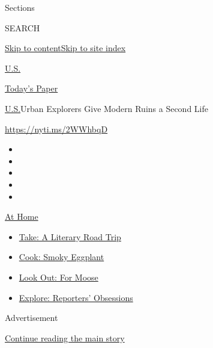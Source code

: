Sections

SEARCH

\protect\hyperlink{site-content}{Skip to
content}\protect\hyperlink{site-index}{Skip to site index}

\href{https://www.nytimes.com/section/us}{U.S.}

\href{https://myaccount.nytimes.com/auth/login?response_type=cookie\&client_id=vi}{}

\href{https://www.nytimes.com/section/todayspaper}{Today's Paper}

\href{/section/us}{U.S.}\textbar{}Urban Explorers Give Modern Ruins a
Second Life

\url{https://nyti.ms/2WWhbqD}

\begin{itemize}
\item
\item
\item
\item
\item
\end{itemize}

\href{https://www.nytimes.com/spotlight/at-home?action=click\&pgtype=Article\&state=default\&region=TOP_BANNER\&context=at_home_menu}{At
Home}

\begin{itemize}
\tightlist
\item
  \href{https://www.nytimes.com/2020/07/28/books/time-for-a-literary-road-trip.html?action=click\&pgtype=Article\&state=default\&region=TOP_BANNER\&context=at_home_menu}{Take:
  A Literary Road Trip}
\item
  \href{https://www.nytimes.com/2020/07/29/magazine/bored-with-your-home-cooking-some-smoky-eggplant-will-fix-that.html?action=click\&pgtype=Article\&state=default\&region=TOP_BANNER\&context=at_home_menu}{Cook:
  Smoky Eggplant}
\item
  \href{https://www.nytimes.com/2020/07/27/travel/moose-michigan-isle-royale.html?action=click\&pgtype=Article\&state=default\&region=TOP_BANNER\&context=at_home_menu}{Look
  Out: For Moose}
\item
  \href{https://www.nytimes.com/interactive/2020/at-home/even-more-reporters-editors-diaries-lists-recommendations.html?action=click\&pgtype=Article\&state=default\&region=TOP_BANNER\&context=at_home_menu}{Explore:
  Reporters' Obsessions}
\end{itemize}

Advertisement

\protect\hyperlink{after-top}{Continue reading the main story}

